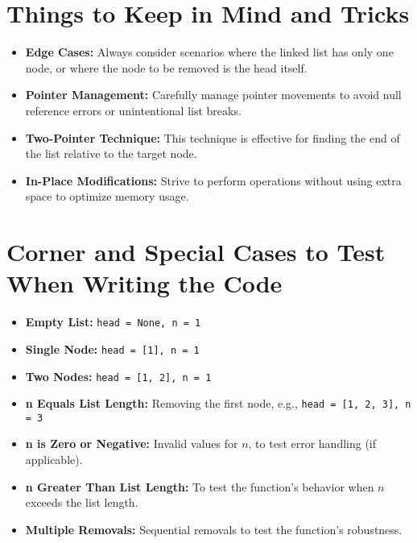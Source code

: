 \section*{Things to Keep in Mind and Tricks}
\begin{itemize}
    \item \textbf{Edge Cases:} Always consider scenarios where the linked list has only one node, or where the node to be removed is the head itself.
    \item \textbf{Pointer Management:} Carefully manage pointer movements to avoid null reference errors or unintentional list breaks.
    \item \textbf{Two-Pointer Technique:} This technique is effective for finding the end of the list relative to the target node.
    \item \textbf{In-Place Modifications:} Strive to perform operations without using extra space to optimize memory usage.
\end{itemize}

\section*{Corner and Special Cases to Test When Writing the Code}
\begin{itemize}
    \item \textbf{Empty List:} \texttt{head = None, n = 1}
    \item \textbf{Single Node:} \texttt{head = [1], n = 1}
    \item \textbf{Two Nodes:} \texttt{head = [1, 2], n = 1}
    \item \textbf{n Equals List Length:} Removing the first node, e.g., \texttt{head = [1, 2, 3], n = 3}
    \item \textbf{n is Zero or Negative:} Invalid values for \(n\), to test error handling (if applicable).
    \item \textbf{n Greater Than List Length:} To test the function's behavior when \(n\) exceeds the list length.
    \item \textbf{Multiple Removals:} Sequential removals to test the function's robustness.
\end{itemize}

\printindex